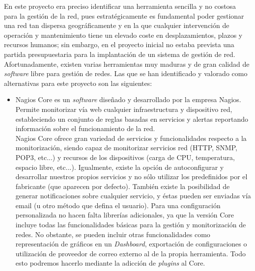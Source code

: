 En este proyecto era preciso identificar una herramienta sencilla y no costosa para la gestión de la red, pues estratégicamente es fundamental poder gestionar una red tan dispersa geográficamente y en la que cualquier intervención de operación y mantenimiento tiene un elevado coste en desplazamientos, plazos y recursos humanos; sin embargo, en el proyecto inicial no estaba prevista una partida presupuestaria para la implantación de un sistema de gestión de red. Afortunadamente, existen varias herramientas muy maduras y de gran calidad de \textit{software} libre para gestión de redes. Las que se han identificado y valorado como alternativas para este proyecto son las siguientes:
	  
	\begin{itemize}
		\item Nagios Core \cite{Nagios} es un \textit{software} diseñado y desarrollado por la empresa Nagios. Permite monitorizar vía web cualquier infraestructura y dispositivo red, estableciendo un conjunto de reglas basadas en servicios y alertas reportando información sobre el funcionamiento de la red.\\
		Nagios Core ofrece gran variedad de servicios y funcionalidades respecto a la monitorización, siendo capaz de monitorizar servicios red (HTTP, SNMP, POP3, etc...) y recursos de los dispositivos (carga de CPU, temperatura, espacio libre, etc...). Igualmente, existe la opción de autoconfigurar y desarrollar nuestros propios servicios y no sólo utilizar los predefinidos por el fabricante (que aparecen por defecto). También existe la posibilidad de generar notificaciones sobre cualquier servicio, y éstas pueden ser enviadas vía email (u otro método que defina el usuario). Para una configuración personalizada no hacen falta librerías adicionales, ya que la versión Core incluye todas las funcionalidades básicas para la gestión y monitorización de redes. No obstante, se pueden incluir otras funcionalidades como representación de gráficos en un \textit{Dashboard}, exportación de configuraciones o utilización de proveedor de correo externo al de la propia herramienta. Todo esto podremos hacerlo mediante la adicción de \textit{plugins} al Core.
		

\end{itemize}
